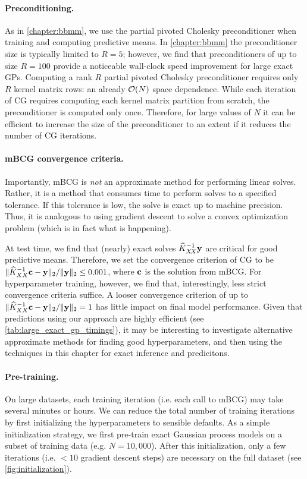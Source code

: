 \paragraph{Preconditioning.}
As in \cref{chapter:bbmm}, we use the partial pivoted Cholesky preconditioner when training and computing predictive means.
In \cref{chapter:bbmm} the preconditioner size is typically limited to $R=5$; however, we find that preconditioners of up to size $R=100$ provide a noticeable wall-clock speed improvement for large exact GPs.
Computing a rank $R$ partial pivoted Cholesky preconditioner requires only $R$ kernel matrix rows: an already $\bigo{N}$ space dependence.
While each iteration of CG requires computing each kernel matrix partition from scratch, the preconditioner is computed only once.
Therefore, for large values of $N$ it can be efficient to increase the size of the preconditioner to an extent if it reduces the number of CG iterations.


\paragraph{mBCG convergence criteria.}
Importantly, mBCG is \emph{not} an approximate method for performing linear solves.
Rather, it is a method that consumes time to perform solves to a specified tolerance.
If this tolerance is low, the solve is exact up to machine precision.
Thus, it is analogous to using gradient descent to solve a convex optimization problem (which is in fact what is happening).

At test time, we find that (nearly) exact solves $\widehat {K}_{X \! X}^{-1} \mathbf{y}$  are critical for good predictive means.
Therefore, we set the convergence criterion of CG to be $\Vert \widehat{K}_{XX}^{-1} \mathbf{c} - \mathbf{y} \Vert_2 / \Vert \mathbf{y} \Vert_2 \leq 0.001$, where $\mathbf{c}$ is the solution from mBCG.
For hyperparameter training, however, we find that, interestingly, less strict convergence criteria suffice.
A looser convergence criterion of up to $\Vert \widehat{K}_{XX}^{-1} \mathbf{c} - \mathbf{y} \Vert_2 / \Vert \mathbf{y} \Vert_2 = 1$ has little impact on final model performance.
Given that predictions using our approach are highly efficient (see \cref{tab:large_exact_gp_timings}), it may be interesting to investigate alternative approximate methods for finding good hyperparameters, and then using the techniques in this chapter for exact inference and predicitons.


\paragraph{Pre-training.}
On large datasets, each training iteration (i.e. each call to mBCG) may take several minutes or hours.
We can reduce the total number of training iterations by first initializing the hyperparameters to sensible defaults.
As a simple initialization strategy, we first pre-train exact Gaussian process models on a subset of training data (e.g. $N=10,\!000$).
After this initialization, only a few iterations (i.e. $< 10$ gradient descent steps) are necessary on the full dataset (see \cref{fig:initialization}).
